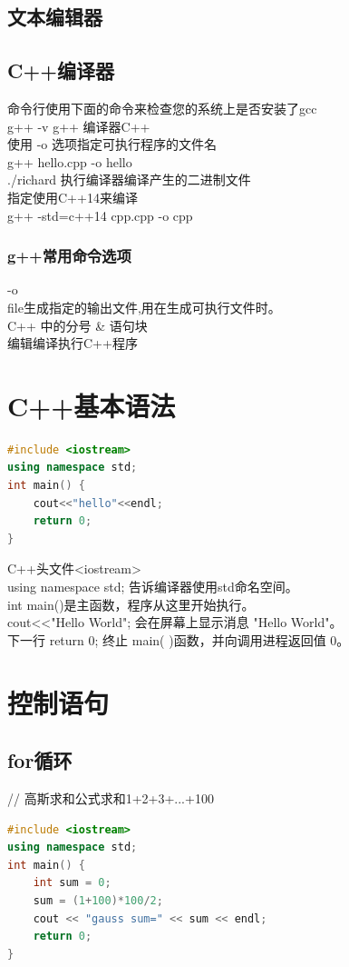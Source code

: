 \documentclass[12pt,twiside,a4paper]{ctexbook}
\numberwithin{chapter}{part}
\begin{document}
\section{文本编辑器}

\section{C++编译器}
命令行使用下面的命令来检查您的系统上是否安装了gcc\\
g++ -v
g++ 编译器C++\\
使用 -o 选项指定可执行程序的文件名\\
g++ hello.cpp -o hello\\
./richard 执行编译器编译产生的二进制文件\\
指定使用C++14来编译\\
g++ -std=c++14 cpp.cpp -o cpp 

\subsection{g++常用命令选项}
-o\\
file生成指定的输出文件,用在生成可执行文件时。\\

C++ 中的分号 & 语句块\\
编辑编译执行C++程序

\chapter{C++基本语法}
\begin{lstlisting}[language=C++]
#include <iostream>
using namespace std;
int main() {
	cout<<"hello"<<endl;
	return 0;
}
\end{lstlisting}
C++头文件<iostream>\\
using namespace std; 告诉编译器使用std命名空间。\\
int main()是主函数，程序从这里开始执行。\\
cout<<"Hello World"; 会在屏幕上显示消息 "Hello World"。\\
下一行 return 0; 终止 main( )函数，并向调用进程返回值 0。

\chapter{控制语句}
\section{for循环}
// 高斯求和公式求和1+2+3+...+100
\begin{lstlisting}[language=C++]
#include <iostream>
using namespace std;
int main() {
    int sum = 0;
    sum = (1+100)*100/2;
    cout << "gauss sum=" << sum << endl;
    return 0;
}
\end{lstlisting}
\end{document}
